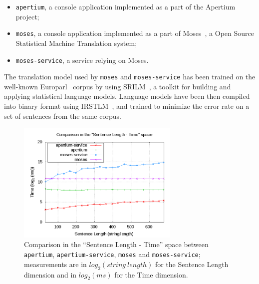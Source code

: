 \documentclass[11pt]{article}
\begin{document}

\begin{itemize}
 \item {\tt\small apertium}, a console application implemented as a part of the Apertium project;
 \item {\tt\small moses}, a console application implemented as a part of Moses~\citep{moses}, a Open Source Statistical Machine Translation system;
 \item {\tt\small moses-service}, a service relying on Moses.
\end{itemize}

The translation model used by {\tt\small moses} and {\tt\small moses-service} has been trained on the well-known Europarl~\citep{europarl} corpus by using SRILM~\citep{srilm}, a toolkit for building and applying statistical language models. Language models have been then compiled into binary format using IRSTLM~\citep{irstlm}, and trained to minimize the error rate on a set of sentences from the same corpus. 

\begin{figure}[!ht]
\begin{center}
\includegraphics[width=7.75cm]{comp}
\end{center}
\caption{Comparison in the ``Sentence Length - Time'' space between {\tt\small apertium}, {\tt\small apertium-service}, {\tt\small moses} and {\tt\small moses-service}; measurements are in $log_{2}(string\ length)$ for the Sentence Length dimension and in $log_{2}(ms)$ for the Time dimension.}
\label{fig:comp}
\end{figure}
\end{document}
